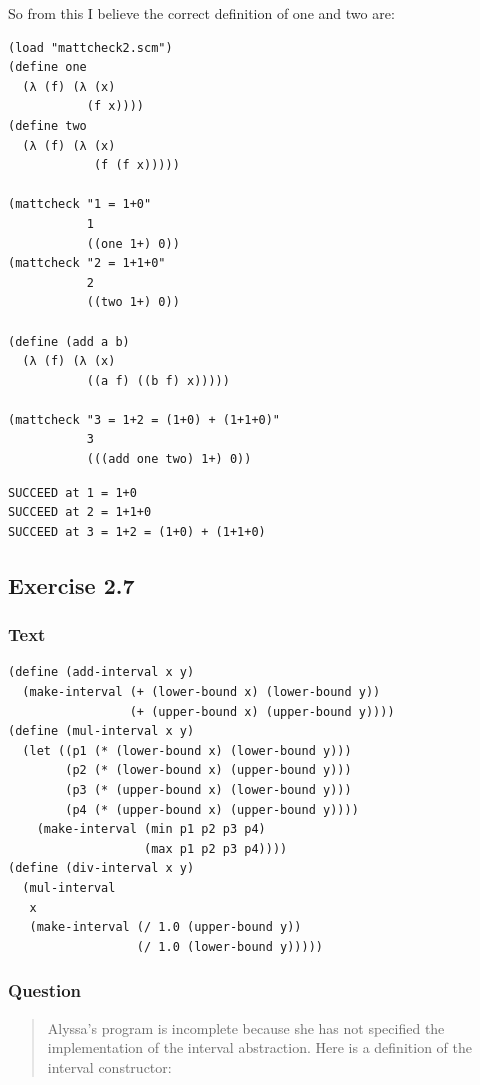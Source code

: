\documentclass[final,fleqn,titlepage]{article}
\begin{document}
So from this I believe the correct definition of one and two are:
\begin{verbatim}
(load "mattcheck2.scm")
(define one
  (λ (f) (λ (x)
           (f x))))
(define two
  (λ (f) (λ (x)
            (f (f x)))))

(mattcheck "1 = 1+0"
           1
           ((one 1+) 0))
(mattcheck "2 = 1+1+0"
           2
           ((two 1+) 0))

(define (add a b)
  (λ (f) (λ (x)
           ((a f) ((b f) x)))))

(mattcheck "3 = 1+2 = (1+0) + (1+1+0)"
           3
           (((add one two) 1+) 0))
\end{verbatim}

\begin{verbatim}
SUCCEED at 1 = 1+0
SUCCEED at 2 = 1+1+0
SUCCEED at 3 = 1+2 = (1+0) + (1+1+0)
\end{verbatim}

\subsection{Exercise 2.7}
\label{sec:orgd02b468}
\subsubsection{Text}
\label{sec:orgce7f901}
\begin{verbatim}
(define (add-interval x y)
  (make-interval (+ (lower-bound x) (lower-bound y))
                 (+ (upper-bound x) (upper-bound y))))
(define (mul-interval x y)
  (let ((p1 (* (lower-bound x) (lower-bound y)))
        (p2 (* (lower-bound x) (upper-bound y)))
        (p3 (* (upper-bound x) (lower-bound y)))
        (p4 (* (upper-bound x) (upper-bound y))))
    (make-interval (min p1 p2 p3 p4)
                   (max p1 p2 p3 p4))))
(define (div-interval x y)
  (mul-interval
   x
   (make-interval (/ 1.0 (upper-bound y))
                  (/ 1.0 (lower-bound y)))))
\end{verbatim}
\subsubsection{Question}
\label{sec:org020862f}
\begin{quote}
Alyssa's program is incomplete because she has not specified the implementation
of the interval abstraction. Here is a definition of the interval constructor:
\end{quote}
\end{document}
